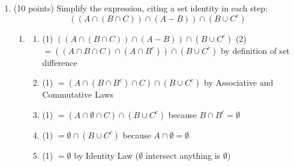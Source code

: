 \documentclass[12pt]{article}
\begin{document}
\begin{enumerate}
	      \vspace{0.5cm}

	\item (10 points) Simplify the expression, citing a set identity in each step:
	      \[
		      ((A \cap (B \cap C)) \cap (A - B)) \cap (B \cup C^c)
	      \]
	      \begin{enumerate}
		      \item
		            \begin{enumerate}
			            \item (1) \(((A \cap (B \cap C)) \cap (A - B)) \cap (B \cup C^c)\)
			                  (2) \(= ((A \cap B \cap C) \cap (A \cap B^c)) \cap (B \cup C^c)\) by definition of set difference
			            \item (1) \(= (A \cap (B \cap B^c) \cap C) \cap (B \cup C^c)\) by Associative and Commutative Laws
			            \item (1) \(= (A \cap \emptyset \cap C) \cap (B \cup C^c)\) because \(B \cap B^c = \emptyset\)
			            \item (1) \(= \emptyset \cap (B \cup C^c)\) because \(A \cap \emptyset = \emptyset\)
			            \item (1) \(= \emptyset\) by Identity Law (\(\emptyset\) intersect anything is \(\emptyset\))
		            \end{enumerate}
	      \end{enumerate}
\end{enumerate}
\end{document}
